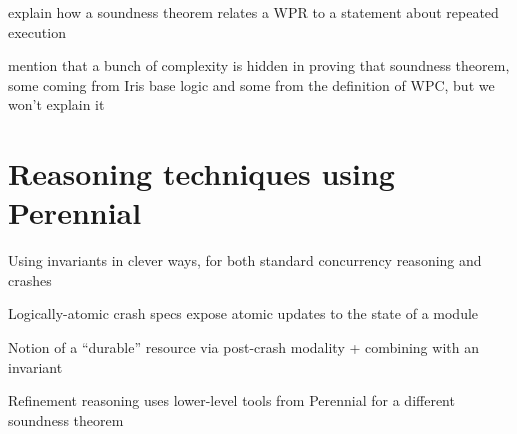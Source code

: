 explain how a soundness theorem relates a WPR to a statement about repeated
execution

mention that a bunch of complexity is hidden in proving that soundness theorem,
some coming from Iris base logic and some from the definition of WPC, but we
won't explain it

\section{Reasoning techniques using Perennial}

Using invariants in clever ways, for both standard concurrency reasoning and
crashes

Logically-atomic crash specs expose atomic updates to the state of a module

Notion of a ``durable'' resource via post-crash modality + combining with an
invariant

Refinement reasoning uses lower-level tools from Perennial for a different
soundness theorem

